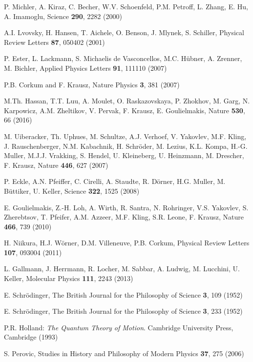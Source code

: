 \documentclass[final,3p,times,twocolumn]{elsarticle3}
\begin{document}
\begin{thebibliography}{88}
P. Michler, A. Kiraz, C. Becher, W.V. Schoenfeld, P.M. Petroff, L. Zhang,
E. Hu, A. Imamoglu, Science {\bf 290}, 2282 (2000)

A.I. Lvovsky, H. Hansen, T. Aichele, O. Benson, J. Mlynek, S. Schiller,
Physical Review Letters {\bf 87}, 050402 (2001)

P. Ester, L. Lackmann, S. Michaelis de Vasconcellos, M.C. H\"ubner, A. Zrenner,
M. Bichler, Applied Physics Letters {\bf 91}, 111110 (2007)

P.B. Corkum and F. Krausz, Nature Physics {\bf 3}, 381 (2007)

M.Th. Hassan, T.T. Luu, A. Moulet, O. Raskazovskaya, P. Zhokhov, M. Garg,
N. Karpowicz, A.M. Zheltikov, V. Pervak, F. Krausz, E. Goulielmakis,
Nature {\bf 530}, 66 (2016)

M. Uiberacker, Th. Uphues, M. Schultze, A.J. Verhoef, V. Yakovlev, M.F. Kling, 
J. Rauschenberger, N.M. Kabachnik, H. Schr\"oder, M. Lezius, K.L. Kompa, H.-G. Muller, 
M.J.J. Vrakking, S. Hendel, U. Kleineberg, U. Heinzmann, M. Drescher, F. Krausz,
Nature {\bf 446}, 627 (2007)

P. Eckle, A.N. Pfeiffer, C. Cirelli, A. Staudte, R. D\"orner, H.G. Muller, M. B\"uttiker,
U. Keller, Science {\bf 322}, 1525 (2008)

E. Goulielmakis, Z.-H. Loh, A. Wirth, R. Santra, N. Rohringer, V.S. Yakovlev, 
S. Zherebtsov, T. Pfeifer, A.M. Azzeer, M.F. Kling, S.R. Leone, F. Krausz,
Nature {\bf 466}, 739 (2010)

H. Niikura, H.J. W\"orner, D.M. Villeneuve, P.B. Corkum,
Physical Review Letters {\bf 107}, 093004 (2011)

L. Gallmann, J. Herrmann, R. Locher, M. Sabbar, A. Ludwig, 
M. Lucchini, U. Keller, Molecular Physics {\bf 111}, 2243
(2013)

E. Schr\"odinger, The British Journal for the Philosophy of Science
{\bf 3}, 109 (1952)

E. Schr\"odinger, The British Journal for the Philosophy of Science
{\bf 3}, 233 (1952)

P.R. Holland: {\it The Quantum Theory of Motion}.
Cambridge University Press, Cambridge (1993)

S. Perovic, 
Studies in History and Philosophy of Modern Physics {\bf 37}, 275 (2006)


\end{thebibliography}
\end{document}
